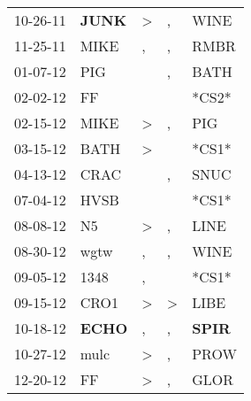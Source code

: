 \begin{supertabular}{p{0.07\textwidth}p{0.06\textwidth}p{0.02\textwidth}p{0.02\textwidth}p{0.06\textwidth}}
          10-26-11\textsuperscript{} &  \textbf{JUNK\textsuperscript{}} &     \textgreater &             , &           WINE\textsuperscript{} \\
          11-25-11\textsuperscript{} &           MIKE\textsuperscript{} &                , &             , &           RMBR\textsuperscript{} \\
          01-07-12\textsuperscript{} &            PIG\textsuperscript{} &                  &             , &           BATH\textsuperscript{} \\
          02-02-12\textsuperscript{} &             FF\textsuperscript{} &                  &               &                            *CS2* \\
          02-15-12\textsuperscript{} &           MIKE\textsuperscript{} &     \textgreater &             , &            PIG\textsuperscript{} \\
          03-15-12\textsuperscript{} &           BATH\textsuperscript{} &     \textgreater &               &                            *CS1* \\
          04-13-12\textsuperscript{} &           CRAC\textsuperscript{} &                  &             , &           SNUC\textsuperscript{} \\
          07-04-12\textsuperscript{} &           HVSB\textsuperscript{} &                  &               &                            *CS1* \\
          08-08-12\textsuperscript{} &             N5\textsuperscript{} &     \textgreater &             , &           LINE\textsuperscript{} \\
          08-30-12\textsuperscript{} &           wgtw\textsuperscript{} &                , &             , &           WINE\textsuperscript{} \\
          09-05-12\textsuperscript{} &           1348\textsuperscript{} &                , &               &                            *CS1* \\
          09-15-12\textsuperscript{} &           CRO1\textsuperscript{} &     \textgreater &  \textgreater &           LIBE\textsuperscript{} \\
          10-18-12\textsuperscript{} &  \textbf{ECHO\textsuperscript{}} &                , &             , &  \textbf{SPIR\textsuperscript{}} \\
          10-27-12\textsuperscript{} &           mulc\textsuperscript{} &     \textgreater &             , &           PROW\textsuperscript{} \\
          12-20-12\textsuperscript{} &             FF\textsuperscript{} &     \textgreater &             , &           GLOR\textsuperscript{} \\

\end{supertabular}
